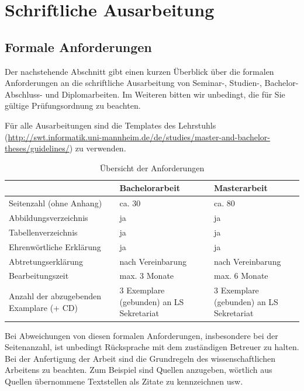 \chapter{Schriftliche Ausarbeitung}

\section{Formale Anforderungen}

Der nachstehende Abschnitt gibt einen kurzen Überblick über die
formalen Anforderungen an die schriftliche Ausarbeitung von Seminar-,
Studien-, Bachelor-Abschluss- und Diplomarbeiten. Im Weiteren bitten wir
unbedingt, die für Sie gültige Prüfungsordnung zu beachten.

Für alle Ausarbeitungen sind die Templates des Lehrstuhls (\url{http://swt.informatik.uni-mannheim.de/de/studies/master-and-bachelor-theses/guidelines/}) zu verwenden.

\begin{table}[tb]
\centering
\begin{tabular}{|p{}*{1}{|p{0.25\textwidth}}|p{0.25\textwidth}|}
\hline
& \textbf{Bachelorarbeit} & \textbf{Masterarbeit}\\
\hline
Seitenzahl (ohne Anhang) & ca. 30 & ca. 80\\ 
\hline
Abbildungsverzeichnis & ja & ja\\
\hline
Tabellenverzeichnis & ja & ja\\
\hline
Ehrenwörtliche Erklärung & ja & ja\\
\hline
Abtretungserkl{\"a}rung & nach Vereinbarung & nach Vereinbarung\\
\hline
Bearbeitungszeit & max. 3 Monate & max. 6 Monate\\
\hline
Anzahl der abzugebenden Examplare (+ CD) & 3 Exemplare (gebunden) an LS Sekretariat & 3 Exemplare (gebunden) an LS Sekretariat\\
\hline
\end{tabular}
\caption{Übersicht der Anforderungen \label{tableAnforderungen}}
\end{table}

Bei Abweichungen von diesen formalen Anforderungen, insbesondere bei der Seitenanzahl, ist unbedingt Rücksprache mit dem zuständigen Betreuer zu halten. Bei der Anfertigung der Arbeit sind die Grundregeln des wissenschaftlichen Arbeitens zu beachten. Zum Beispiel sind Quellen anzugeben, wörtlich aus Quellen übernommene Textstellen als Zitate zu kennzeichnen usw.

